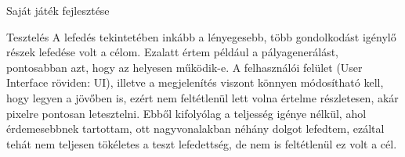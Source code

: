 \begin{MyChapter}{Saját játék fejlesztése}
\begin{MySection}{Tesztelés}
			A lefedés tekintetében inkább a lényegesebb, több gondolkodást igénylő részek lefedése volt a célom.
			Ezalatt értem például a pályagenerálást, pontosabban azt, hogy az helyesen működik-e. 
			A felhasználói felület (User Interface röviden: UI), illetve a megjelenítés viszont könnyen módosítható kell, hogy legyen a jövőben is, ezért nem feltétlenül lett volna értelme részletesen, akár pixelre pontosan letesztelni. 
			Ebből kifolyólag a teljesség igénye nélkül, ahol érdemesebbnek tartottam, ott nagyvonalakban néhány dolgot lefedtem, ezáltal tehát nem teljesen tökéletes a teszt lefedettség, de nem is feltétlenül ez volt a cél. 
			
	
			
			
		

\end{MySection}
\end{MyChapter}
